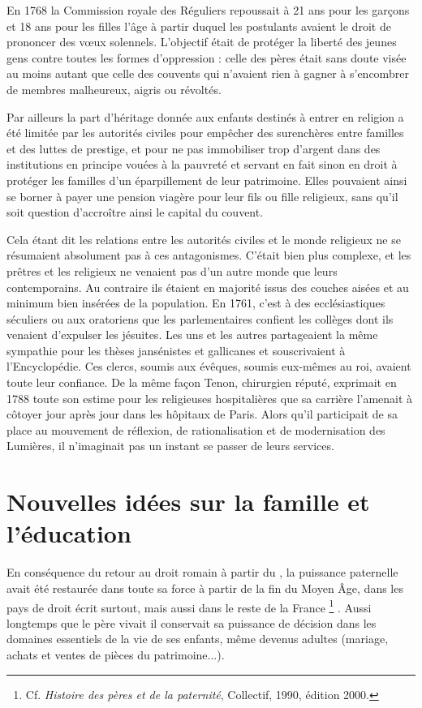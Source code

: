  En 1768 la Commission royale des Réguliers repoussait à 21 ans pour les garçons et 18 ans pour les filles l'âge à partir duquel les postulants avaient le droit de prononcer des vœux solennels. L'objectif était de protéger la liberté des jeunes gens contre toutes les formes d'oppression : celle des pères était sans doute visée au moins autant que celle des couvents qui n'avaient rien à gagner à s'encombrer de membres malheureux, aigris ou révoltés.

 Par ailleurs la part d'héritage donnée aux enfants destinés à entrer en religion a été limitée par les autorités civiles pour empêcher des surenchères entre familles et des luttes de prestige, et pour ne pas immobiliser trop d'argent dans des institutions en principe vouées à la pauvreté et servant en fait sinon en droit à protéger les familles d'un éparpillement de leur patrimoine. Elles pouvaient ainsi se borner à payer une pension viagère pour leur fils ou fille religieux, sans qu'il soit question d'accroître ainsi le capital du couvent.

 Cela étant dit les relations entre les autorités civiles et le monde religieux ne se résumaient absolument pas à ces antagonismes. C'était bien plus complexe, et les prêtres et les religieux ne venaient pas d'un autre monde que leurs contemporains. Au contraire ils étaient en majorité issus des couches aisées et au minimum bien insérées de la population. En 1761, c'est à des ecclésiastiques séculiers ou aux oratoriens que les parlementaires confient les collèges dont ils venaient d'expulser les jésuites. Les uns et les autres partageaient la même sympathie pour les thèses jansénistes et gallicanes et souscrivaient à l'Encyclopédie. Ces clercs, soumis aux évêques, soumis eux-mêmes au roi, avaient toute leur confiance. De la même façon Tenon, chirurgien réputé, exprimait en 1788 toute son estime pour les religieuses hospitalières que sa carrière l'amenait à côtoyer jour après jour dans les hôpitaux de Paris. Alors qu'il participait de sa place au mouvement de réflexion, de rationalisation et de modernisation des Lumières, il n'imaginait pas un instant se passer de leurs services. 


\section{Nouvelles idées sur la famille et l'éducation}

 En conséquence du retour au droit romain à partir du , la puissance paternelle avait été restaurée dans toute sa force à partir de la fin du Moyen Âge, dans les pays de droit écrit surtout, mais aussi dans le reste de la France%
\footnote{Cf. \emph{Histoire des pères et de la paternité}, Collectif, 1990, édition 2000.}%
. Aussi longtemps que le père vivait il conservait sa puissance de décision dans les domaines essentiels de la vie de ses enfants, même devenus adultes (mariage, achats et ventes de pièces du patrimoine...). 

